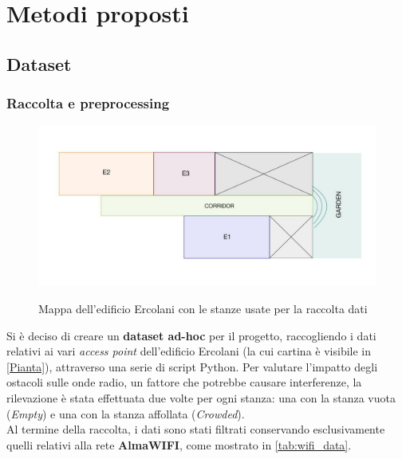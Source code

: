 \documentclass{article}
\begin{document}
\section{Metodi proposti}
\subsection{Dataset}
\subsubsection{Raccolta e preprocessing}
\begin{figure}[ht!]
    \centering
    {\includegraphics[scale=0.28]{img/piantinaErcolani.JPG}}
    \caption{Mappa dell’edificio Ercolani con le stanze usate per la raccolta dati}
    \label{Pianta}
\end{figure}
Si è deciso di creare un \textbf{dataset ad-hoc} per il progetto, raccogliendo i dati relativi ai vari \textit{access point} dell'edificio Ercolani (la cui cartina è visibile in \autoref{Pianta}), attraverso una serie di script Python.
Per valutare l'impatto degli ostacoli sulle onde radio, un fattore che potrebbe causare interferenze, la rilevazione è stata effettuata due volte per ogni stanza: una con la stanza vuota (\textit{Empty}) e una con la stanza affollata (\textit{Crowded}). \\
Al termine della raccolta, i dati sono stati filtrati conservando esclusivamente quelli relativi alla rete \textbf{AlmaWIFI}, come mostrato in \autoref{tab:wifi_data}.
\end{document}
